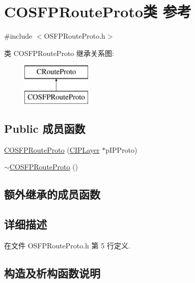 \hypertarget{class_c_o_s_f_p_route_proto}{}\section{C\+O\+S\+F\+P\+Route\+Proto类 参考}
\label{class_c_o_s_f_p_route_proto}


{\ttfamily \#include $<$O\+S\+F\+P\+Route\+Proto.\+h$>$}

类 C\+O\+S\+F\+P\+Route\+Proto 继承关系图\+:\begin{figure}[H]
\begin{center}
\leavevmode
\includegraphics[height=2.000000cm]{class_c_o_s_f_p_route_proto}
\end{center}
\end{figure}
\subsection*{Public 成员函数}
\begin{DoxyCompactItemize}
\item 
\hyperlink{class_c_o_s_f_p_route_proto_a4a7e4d4d5c3c6d17fd45a1aca66c628c}{C\+O\+S\+F\+P\+Route\+Proto} (\hyperlink{class_c_i_p_layer}{C\+I\+P\+Layer} $\ast$p\+I\+P\+Proto)
\item 
\hyperlink{class_c_o_s_f_p_route_proto_a9a16b32c83097c2273bd73da0cf491da}{$\sim$\+C\+O\+S\+F\+P\+Route\+Proto} ()
\end{DoxyCompactItemize}
\subsection*{额外继承的成员函数}


\subsection{详细描述}


在文件 O\+S\+F\+P\+Route\+Proto.\+h 第 5 行定义.



\subsection{构造及析构函数说明}
\mbox{\label{class_c_o_s_f_p_route_proto_a4a7e4d4d5c3c6d17fd45a1aca66c628c}} 

